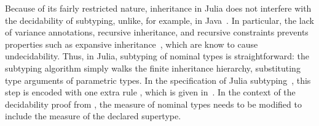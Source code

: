 Because of its fairly restricted nature, inheritance in Julia does not
interfere with the decidability of subtyping, unlike, for example,
in Java~\cite{bib:tate:taming-wildcards:2011}.
In particular, the lack of variance annotations, recursive inheritance,
and recursive constraints prevents properties such as expansive
inheritance~\cite{bib:kennedy:nom-sub-var-dec:2007}, which are know to cause
undecidability.
Thus, in Julia, subtyping of nominal types is straightforward: the subtyping
algorithm simply walks the finite inheritance hierarchy, substituting
type arguments of parametric types.
In the specification of Julia
subtyping~\cite{bib:zappa-nardelli:julia-sub:oopsla:2018},
this step is encoded with one extra rule ,
which is given in~.
In the context of the decidability proof from ,
the measure of nominal types needs to be modified to include the 
measure of the declared supertype.

